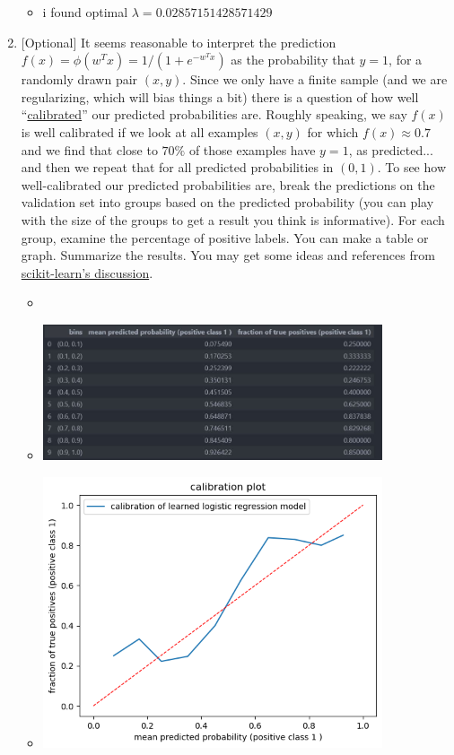 \documentclass{article}
\theoremstyle{plain}
\theoremstyle{definition}
\begin{document}
\begin{enumerate}
\begin{itemize}
\item i found optimal $\lambda =0.02857151428571429$
\end{itemize}
\item {[}Optional{]} 
It seems reasonable to interpret the prediction $f(x)=\phi(w^{T}x)=1/(1+e^{-w^{T}x})$
as the probability that $y=1$, for a randomly drawn pair $\left(x,y\right)$.
Since we only have a finite sample (and we are regularizing, which
will bias things a bit) there is a question of how well ``\href{https://en.wikipedia.org/wiki/Calibration_(statistics)}{calibrated}''
our predicted probabilities are. Roughly speaking, we say $f(x)$
is well calibrated if we look at all examples $\left(x,y\right)$
for which $f(x)\approx0.7$ and we find that close to $70\%$ of those
examples have $y=1$, as predicted... and then we repeat that for
all predicted probabilities in $\left(0,1\right)$. To see how well-calibrated
our predicted probabilities are, break the predictions on the validation
set into groups based on the predicted probability (you can play with
the size of the groups to get a result you think is informative).
For each group, examine the percentage of positive labels. You can
make a table or graph. Summarize the results. You may get some ideas
and references from \href{http://scikit-learn.org/stable/modules/calibration.html}{scikit-learn's discussion}.
\begin{itemize}
  \item \inputminted[firstline=174, lastline=191, breaklines=True]{python}{hw_4_code.py}
\item \includegraphics[width=10cm]{homework/homework_4/immages/question_8_1.JPG}
\item \includegraphics[width=10cm]{homework/homework_4/immages/q_8_2output.png}
\end{itemize}



\setcounter{saveenum}{\value{enumi}}
\end{enumerate}
\end{document}

